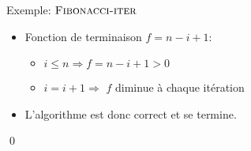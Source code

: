\begin{frame}{Exemple: $\textnormal{\scshape Fibonacci-iter}$}

\begin{center}
\end{center}

\begin{itemize}
\item Fonction de terminaison $f=n-i+1$:
\begin{itemize}
\item $i\leq n \Rightarrow f=n-i+1>0$
\item $i=i+1 \Rightarrow$ $f$ diminue à chaque itération
\end{itemize}
\item L'algorithme est donc correct et se termine.
\end{itemize}
\qed
\end{frame}






